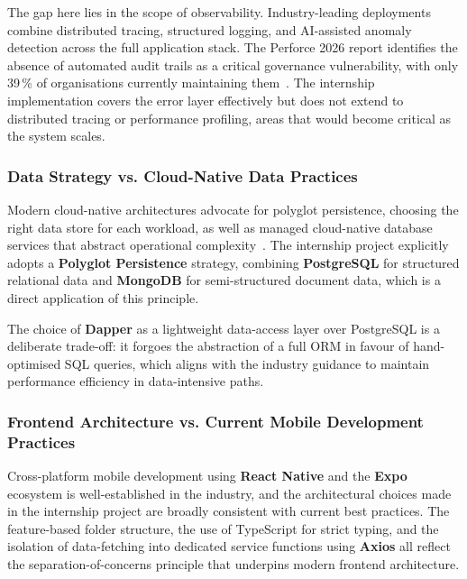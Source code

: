 The gap here lies in the scope of observability.
Industry-leading deployments combine distributed tracing, structured
logging, and AI-assisted anomaly detection across the full
application stack. The Perforce 2026 report identifies the absence of
automated audit trails as a critical governance vulnerability, with
only 39\,\% of organisations currently maintaining
them~\cite{perforce2026devops}. The internship implementation covers
the error layer effectively but does not extend to distributed
tracing or performance profiling, areas that would become critical as
the system scales.
 
 
\subsubsection{Data Strategy vs. Cloud-Native Data
Practices}\label{subsub:contrast:data}
 
Modern cloud-native architectures advocate for polyglot persistence,
choosing the right data store for each workload, as well as managed
cloud-native database services that abstract operational
complexity~\cite{techzine2025}.
The internship project explicitly adopts a \textbf{Polyglot
Persistence} strategy, combining \textbf{PostgreSQL} for structured
relational data and \textbf{MongoDB} for semi-structured document
data, which is a direct application of this principle.
 
The choice of \textbf{Dapper} as a lightweight data-access layer
over PostgreSQL is a deliberate trade-off: it forgoes the abstraction
of a full ORM in favour of hand-optimised SQL queries, which aligns
with the industry guidance to maintain performance efficiency in
data-intensive paths.
 
 
\subsubsection{Frontend Architecture vs. Current Mobile Development
Practices}\label{sec:contrast:frontend}
 
Cross-platform mobile development using \textbf{React Native} and the
\textbf{Expo} ecosystem is well-established in the industry, and the
architectural choices made in the internship project are broadly
consistent with current best practices.
The feature-based folder structure, the use of TypeScript for strict
typing, and the isolation of data-fetching into dedicated service
functions using \textbf{Axios} all reflect the separation-of-concerns
principle that underpins modern frontend architecture.
 
